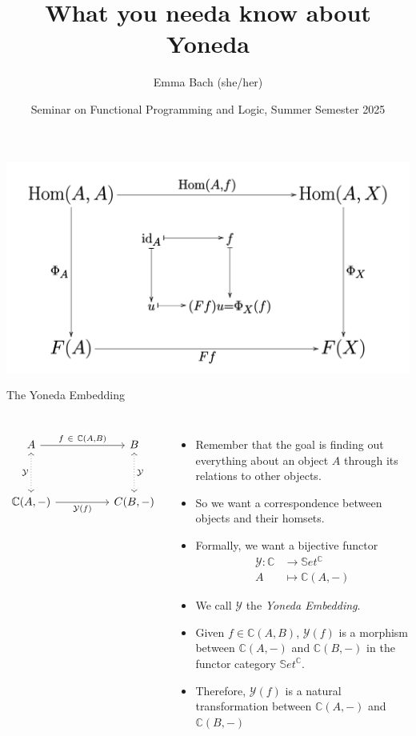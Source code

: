 \documentclass[aspectratio=169]{beamer} %
\title{What you needa know about Yoneda}
\author{Emma Bach (she/her)}
\date{Seminar on Functional Programming and Logic, Summer Semester 2025}
\newcommand{\bC}{\mathbb{C}}
\newcommand{\bS}{\mathbb{S}}
\newcommand{\mY}{\mathcal{Y}}
\begin{document}

\begin{frame}[plain]
    \includegraphics[width=0.4\paperwidth]{figures/Yoneda_lemma_cd.svg.png}
    \titlepage
\end{frame}




\begin{frame}[fragile]{The Yoneda Embedding}
\begin{columns}
\[\begin{tikzcd}
	A && B \\
	\\
	{\mathbb{C}(A, -)} && {C(B,-)}
	\arrow["{f\ \in\ \mathbb{C}(A,B)}", from=1-1, to=1-3]
	\arrow["{\mathcal{Y}}"', dotted, leftrightarrow, from=1-1, to=3-1]
	\arrow["{\mathcal{Y}}", dotted, leftrightarrow, from=1-3, to=3-3]
	\arrow["{\mathcal{Y}(f)}"', from=3-1, to=3-3]
\end{tikzcd}\]
 \begin{itemize}
    \item Remember that the goal is finding out everything about an object $A$ through its relations to other objects.
    \pause\item So we want a correspondence between objects and their homsets.
    \pause\item Formally, we want a bijective functor
    \begin{align*}
     \mY : \bC &\to \bS et^\bC\\
           A &\mapsto \bC(A,-)
    \end{align*}
    \vspace{-16pt}\pause\item We call $\mY$ the \textit{Yoneda Embedding}.
    \pause\item Given $f \in \bC(A,B)$, $\mY(f)$ is a morphism between $\bC(A, -)$ and $\bC(B, -)$ in the functor category $\bS et^{\bC}$.
    \pause\item Therefore, $\mY(f)$ is a natural transformation between $\bC(A, -)$ and $\bC(B, -)$
 \end{itemize}
\end{columns}
\end{frame}
\end{document}
